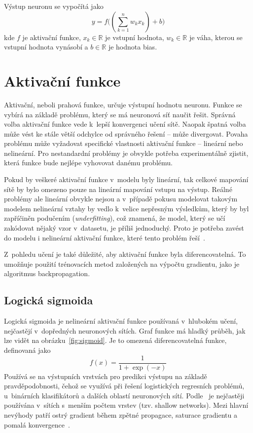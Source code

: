 Výstup neuronu se vypočítá jako
\begin{equation}
	y = f\Big((\sum_{k=1}^n w_kx_k) + b\Big)
\end{equation}
kde $f$ je aktivační funkce, $x_k \in \mathbb{R}$ je vstupní hodnota, $w_k \in \mathbb{R}$ je váha, kterou se vstupní hodnota vynásobí a $b \in \mathbb{R}$ je hodnota bias.


\section{Aktivační funkce}
Aktivační, neboli prahová funkce, určuje výstupní hodnotu neuronu. Funkce se vybírá na základě problému, který se má neuronová síť naučit řešit. Správná volba aktivační funkce vede k~lepší konvergenci učení sítě. Naopak špatná volba může vést ke stále větší odchylce od správného řešení -- může divergovat. Povaha problému může vyžadovat specifické vlastnosti aktivační funkce -- lineární nebo nelineární. Pro nestandardní problémy je obvykle potřeba experimentálně zjistit, která funkce bude nejlépe vyhovovat danému problému. 

Pokud by veškeré aktivační funkce v~modelu byly lineární, tak celkové mapování sítě by bylo omezeno pouze na lineární mapování vstupu na výstup. Reálné problémy ale lineární obvykle nejsou a v~případě pokusu modelovat takovým modelem nelineární vztahy by vedlo k~velice nepřesným výsledkům, který by byl zapříčiněn podučením (\textit{underfitting}), což znamená, že model, který se učí zakódovat nějaký vzor v~datasetu, je příliš jednoduchý. Proto je potřeba zavést do modelu i nelineární aktivační funkce, které tento problém řeší~\cite{mitdeeplearning_small}.

Z~pohledu učení je také důležité, aby aktivační funkce byla diferencovatelná. To umožňuje použití trénovacích metod založených na výpočtu gradientu, jako je algoritmus backpropagation.



\subsection*{Logická sigmoida}
Logická sigmoida je nelineární aktivační funkce používaná v~hlubokém učení, nejčastějí v~dopředných neuronových sítích. Graf funkce má hladký průběh, jak lze vidět na obrázku~\ref{fig:sigmoid}. Je to omezená diferencovatelná funkce, definovaná jako
\begin{equation}
  f(x) = \frac{1}{1+\exp(-x)}
\end{equation}
Používá se na výstupních vrstvách pro predikci výstupu na základě pravděpodobnosti, čehož se využívá při řešení logistických regresních problémů, u~binárních klasifikátorů a dalších oblastí neuronových sítí. Podle~\cite{NEAL199271} je nejčastěji používána v~sítích s~menším počtem vrstev (tzv. shallow networks). Mezi hlavní nevýhody patří ostrý gradient během zpětné propagace, saturace gradientu a pomalá konvergence~\cite{nwankpa2018activation}.

